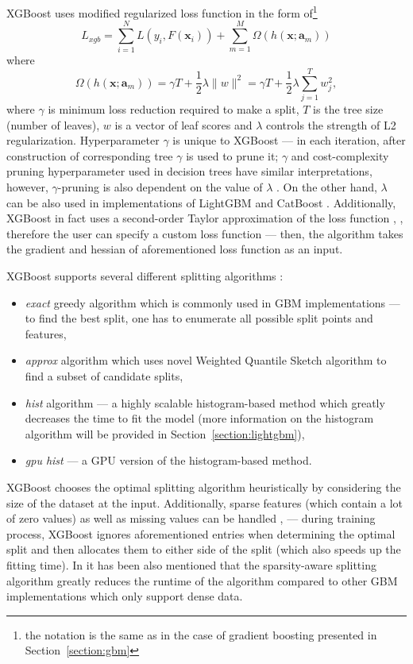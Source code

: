 \documentclass[magisterska, english]{pwr_wmat_praca_dyplomowa}
\theoremstyle{plain}
\numberwithin{theorem}{chapter}
\theoremstyle{definition}
\numberwithin{theorem}{chapter}
\begin{document}
XGBoost uses modified regularized loss function \cite{comparative_analysis} in the form of\footnote{the notation is the same as in the case of gradient boosting presented in Section~\ref{section:gbm}}
\begin{equation}\label{eq:xgboost_loss}
    L_{xgb} = \sum_{i=1}^N L\left(y_i, F(\mathbf{x}_i)\right) + \sum_{m=1}^M \Omega\left(h(\mathbf{x};\mathbf{a}_m)\right)
\end{equation}
where
\begin{equation}
    \Omega\left(h(\mathbf{x};\mathbf{a}_m)\right) = \gamma T + \frac12\lambda \lVert w\rVert^2 = \gamma T +\frac12\lambda\sum_{j=1}^T w_j^2,
\end{equation}
where $\gamma$ is minimum loss reduction required to make a split, $T$ is the tree size (number of leaves), $w$ is a vector of leaf scores and $\lambda$ controls the strength of L2 regularization. Hyperparameter $\gamma$ is unique to XGBoost --- in each iteration, after construction of corresponding tree $\gamma$ is used to prune it; $\gamma$ and cost-complexity pruning hyperparameter used in decision trees have similar interpretations, however, $\gamma$-pruning is also dependent on the value of $\lambda$ \cite{xgboost}. On the other hand, $\lambda$ can be also used in implementations of LightGBM \cite{lightgbm} and CatBoost \cite{catboost}. Additionally, XGBoost in fact uses a second-order Taylor approximation of the loss function \cite{xgboost}, \cite{add_log}, therefore the user can specify a custom loss function --- then, the algorithm takes the gradient and hessian of aforementioned loss function as an input.

XGBoost supports several different splitting algorithms \cite{xgboost}:
\begin{itemize}
    \item\emph{exact} greedy algorithm which is commonly used in GBM implementations --- to find the best split, one has to enumerate all possible split points and features,
    \item\emph{approx} algorithm which uses novel Weighted Quantile Sketch algorithm \cite{xgboost} to find a subset of candidate splits,
    \item\emph{hist} algorithm --- a highly scalable histogram-based method which greatly decreases the time to fit the model (more information on the histogram algorithm will be provided in Section~\ref{section:lightgbm}),
    \item\emph{gpu hist} --- a GPU version of the histogram-based method.
\end{itemize}
XGBoost chooses the optimal splitting algorithm heuristically by considering the size of the dataset at the input. Additionally, sparse features (which contain a lot of zero values) as well as missing values can be handled \cite{comparative_analysis}, \cite{comparison_of} --- during training process, XGBoost ignores aforementioned entries when determining the optimal split and then allocates them to either side of the split (which also speeds up the fitting time). In \cite{xgboost} it has been also mentioned that the sparsity-aware splitting algorithm greatly reduces the runtime of the algorithm compared to other GBM implementations which only support dense data.
\end{document}
